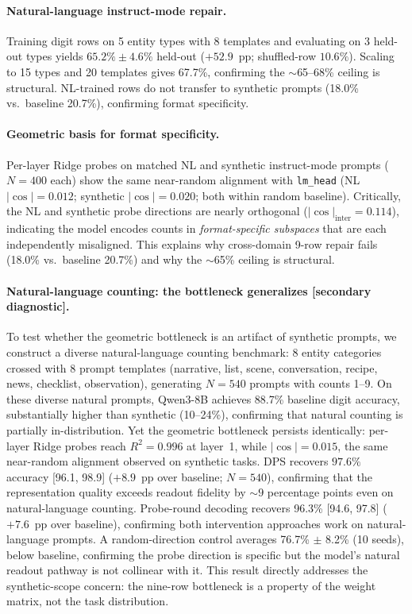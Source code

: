 \documentclass{article}
\begin{document}
\paragraph{Natural-language instruct-mode repair.}
Training digit rows on 5 entity types with 8 templates and evaluating on
3 held-out types yields $\mathbf{65.2\% \pm 4.6\%}$ held-out ($+52.9$~pp;
shuffled-row $10.6\%$).
Scaling to 15 types and 20 templates gives 67.7\%, confirming the $\sim$65--68\% ceiling
is structural.
NL-trained rows do not transfer to synthetic prompts (18.0\% vs.\ baseline 20.7\%),
confirming format specificity.

\paragraph{Geometric basis for format specificity.}
Per-layer Ridge probes on matched NL and synthetic instruct-mode prompts
($N{=}400$ each) show the same near-random alignment with \texttt{lm\_head}
(NL $|\cos| = 0.012$; synthetic $|\cos| = 0.020$; both within random baseline).
Critically, the NL and synthetic probe directions are nearly orthogonal
($|\cos|_{\text{inter}} = 0.114$), indicating the model encodes counts in
\emph{format-specific subspaces} that are each independently misaligned.
This explains why cross-domain 9-row repair fails (18.0\% vs.\ baseline 20.7\%)
and why the $\sim$65\% ceiling is structural.

\paragraph{Natural-language counting: the bottleneck generalizes [secondary diagnostic].}
\label{sec:dps_natural}
To test whether the geometric bottleneck is an artifact of synthetic prompts,
we construct a diverse natural-language counting benchmark: 8 entity categories
crossed with 8 prompt templates (narrative, list, scene, conversation, recipe, news,
checklist, observation), generating $N{=}540$ prompts with counts 1--9.
On these diverse natural prompts, Qwen3-8B achieves 88.7\% baseline digit accuracy, substantially
higher than synthetic (10--24\%), confirming that natural counting is partially in-distribution.
Yet the geometric bottleneck persists identically: per-layer Ridge probes reach
$R^2 = 0.996$ at layer~1, while $|\cos| = 0.015$, the same near-random alignment
observed on synthetic tasks.
DPS recovers $\mathbf{97.6\%}$ accuracy [96.1, 98.9] ($+8.9$~pp over baseline; $N{=}540$),
confirming that the representation quality exceeds readout fidelity by
${\sim}9$ percentage points even on natural-language counting.
Probe-round decoding recovers 96.3\% [94.6, 97.8] ($+7.6$~pp over baseline),
confirming both intervention approaches work on natural-language prompts.
A random-direction control averages 76.7\% $\pm$ 8.2\% (10 seeds), below baseline,
confirming the probe direction is specific but the model's natural readout pathway
is not collinear with it.
This result directly addresses the synthetic-scope concern: the nine-row bottleneck
is a property of the weight matrix, not the task distribution.
\end{document}
